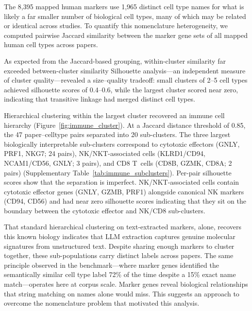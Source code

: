 \documentclass[10pt,twocolumn]{article}
\theoremstyle{plain}
\theoremstyle{definition}
\theoremstyle{remark}
\begin{document}
The 8{,}395 mapped human markers use 1{,}965 distinct cell type names for what is likely a far smaller number of biological cell types, many of which may be related or identical across studies. To quantify this nomenclature heterogeneity, we computed pairwise Jaccard similarity between the marker gene sets of all mapped human cell types across papers. 

As expected from the Jaccard-based grouping, within-cluster similarity far exceeded between-cluster similarity  Silhouette analysis---an independent measure of cluster quality---revealed a size--quality tradeoff: small clusters of 2--5 cell types achieved silhouette scores of 0.4--0.6, while the largest cluster scored near zero, indicating that transitive linkage had merged distinct cell types.

Hierarchical clustering within the largest cluster recovered an immune cell hierarchy (Figure~\ref{fig:immune_cluster}). At a Jaccard distance threshold of 0.85, the 47 paper--celltype pairs separated into 20 sub-clusters. The three largest biologically interpretable sub-clusters correspond to cytotoxic effectors (GNLY, PRF1, NKG7; 24 pairs), NK/NKT-associated cells (KLRD1/CD94, NCAM1/CD56, GNLY; 3 pairs), and CD8 T~cells (CD8B, GZMK, CD8A; 2 pairs) (Supplementary Table~\ref{tab:immune_subclusters}). Per-pair silhouette scores show that the separation is imperfect. NK/NKT-associated cells contain cytotoxic effector genes (GNLY, GZMB, PRF1) alongside canonical NK markers (CD94, CD56) and had near zero silhouette scores indicating that they sit on the boundary between the cytotoxic effector and NK/CD8 sub-clusters.

That standard hierarchical clustering on text-extracted markers, alone, recovers this known biology indicates that LLM extraction captures genuine molecular signatures from unstructured text. Despite sharing enough markers to cluster together, these sub-populations carry distinct labels across papers. The same principle observed in the benchmark---where marker genes identified the semantically similar cell type label 72\% of the time despite a 15\% exact name match---operates here at corpus scale. Marker genes reveal biological relationships that string matching on names alone would miss. This suggests an approach to overcome the nomenclature problem that motivated this analysis.
\end{document}
